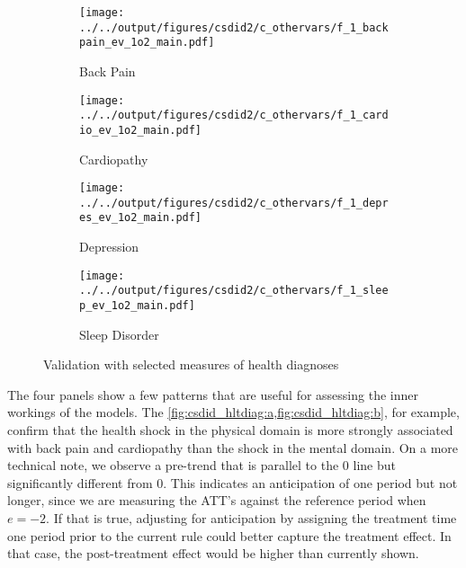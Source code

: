 \begin{figure}[tb!]
    \centering
    \begin{subfigure}{0.475\textwidth}
        \caption{Back Pain}
        \texttt{[image: ../../output/figures/csdid2/c\_othervars/f\_1\_backpain\_ev\_1o2\_main.pdf]}
        \label{fig:csdid_hltdiag:a}
    \end{subfigure}
    \begin{subfigure}{0.475\textwidth}
        \caption{Cardiopathy}
        \texttt{[image: ../../output/figures/csdid2/c\_othervars/f\_1\_cardio\_ev\_1o2\_main.pdf]}
        \label{fig:csdid_hltdiag:b}
    \end{subfigure}
    \begin{subfigure}{0.475\textwidth}
        \caption{Depression}
        \texttt{[image: ../../output/figures/csdid2/c\_othervars/f\_1\_depres\_ev\_1o2\_main.pdf]}
        \label{fig:csdid_hltdiag:c}
    \end{subfigure}
    \begin{subfigure}{0.475\textwidth}
        \caption{Sleep Disorder}
        \texttt{[image: ../../output/figures/csdid2/c\_othervars/f\_1\_sleep\_ev\_1o2\_main.pdf]}
        \label{fig:csdid_hltdiag:d}
    \end{subfigure}
    \caption{Validation with selected measures of health diagnoses} 
    \label{fig:csdid_hltdiag}
\end{figure}

The four panels show a few patterns that are useful for assessing the inner workings of the models.
The \cref{fig:csdid_hltdiag:a,fig:csdid_hltdiag:b}, for example, confirm that the health shock in the physical domain is more strongly associated with back pain and cardiopathy than the shock in the mental domain.
On a more technical note, we observe a pre-trend that is parallel to the 0 line but significantly different from 0.
This indicates an anticipation of one period but not longer, since we are measuring the ATT's against the reference period when $e=-2$.
If that is true, adjusting for anticipation by assigning the treatment time one period prior to the current rule could better capture the treatment effect.
In that case, the post-treatment effect would be higher than currently shown.


